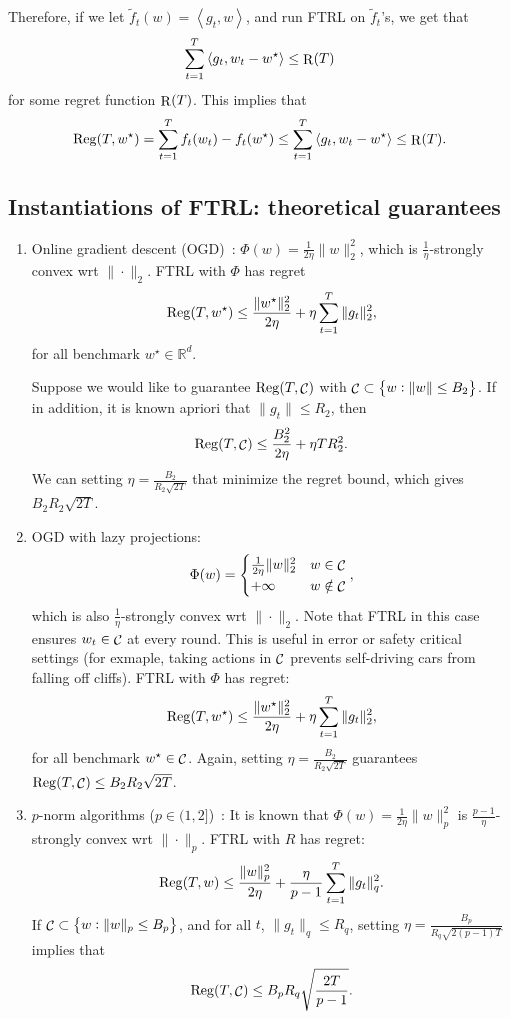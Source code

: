 \documentclass{article}
\DeclareMathOperator*{\Reg}{{\rm Reg}}
\DeclareMathOperator*{\R}{{\rm R}}
\DeclareMathOperator*{\Ccal}{{\cal C}}
\newcommand{\RR}{\mathbb{R}} %
\newcommand{\inner}[2]{\left\langle #1,#2 \right\rangle}
\begin{document}
Therefore, if we let $\tilde{f}_t(w) = \inner{g_t}{w}$, and run FTRL on $\tilde{f}_t$'s, we get that
\[ \sum_{t=1}^T \inner{g_t}{w_t - w^\star} \leq \R(T) \]
for some regret function $\R(T)$. This implies that
\[ \Reg(T, w^\star) = \sum_{t=1}^T f_t(w_t) - f_t(w^\star) \leq \sum_{t=1}^T \inner{g_t}{w_t - w^\star} \leq \R(T). \]

\subsection{Instantiations of FTRL: theoretical guarantees}

\begin{enumerate}
  \item Online gradient descent (OGD)~\cite{zinkevich2003online}: $\Phi(w) = \frac{1}{2\eta}\| w \|_2^2$, which is $\frac1\eta$-strongly convex wrt $\| \cdot \|_2$. FTRL with $\Phi$ has regret
  \[ \Reg(T, w^\star) \leq \frac{\| w^\star \|_2^2}{2\eta} + \eta \sum_{t=1}^T \| g_t \|_2^2, \]
  for all benchmark $w^\star \in \RR^d$.

  Suppose we would like to guarantee $\Reg(T, \Ccal)$ with
  $\Ccal \subset \cbr{w: \| w\| \leq B_2}$.
  If in addition, it is known apriori that $\| g_t \| \leq R_2$, then
  \[ \Reg(T, \Ccal) \leq \frac{B_2^2}{2\eta} + \eta T R_2^2. \]
  We can setting $\eta = \frac{B_2}{R_2\sqrt{2T}}$ that minimize the regret bound, which gives $B_2 R_2 \sqrt{2T}$.

  \item OGD with lazy projections:
  \[ \Phi(w) = \begin{cases} \frac{1}{2\eta}\| w \|_2^2 & w \in \Ccal \\ +\infty & w \notin \Ccal \end{cases}, \]
  which is also $\frac1\eta$-strongly convex wrt $\| \cdot \|_2$. Note that FTRL in this case ensures $w_t \in \Ccal$ at every round. This is useful in error or safety critical settings (for exmaple, taking actions in $\Ccal$ prevents self-driving cars from falling off cliffs).
  FTRL with $\Phi$ has regret:
  \[ \Reg(T, w^\star) \leq \frac{\| w^\star \|_2^2}{2\eta} + \eta \sum_{t=1}^T \| g_t \|_2^2, \]
  for all benchmark $w^\star \in \Ccal$. Again, setting $\eta = \frac{B_2}{R_2\sqrt{2T}}$ guarantees $\Reg(T, \Ccal) \leq B_2 R_2 \sqrt{2T}$.

  \item $p$-norm algorithms ($p \in (1, 2]$)~\cite{grove2001general,gentile2003robustness}: It is known that $\Phi(w) = \frac{1}{2\eta}\| w \|_p^2$ is $\frac{p-1}\eta$-strongly convex wrt $\| \cdot \|_p$. FTRL with $R$ has regret:
  \[ \Reg(T, w) \leq \frac{\| w \|_p^2}{2\eta} + \frac{\eta}{p-1} \sum_{t=1}^T \| g_t \|_q^2. \]
  If $\Ccal \subset \cbr{w: \| w \|_p \leq B_p}$, and for all $t$, $\| g_t \|_q \leq R_q$,
  setting $\eta = \frac{B_p}{R_q\sqrt{2(p-1)T}}$ implies that
  \[ \Reg(T, \Ccal) \leq B_p R_q \sqrt{\frac{2T}{p-1}}. \]


\end{enumerate}
\end{document}
